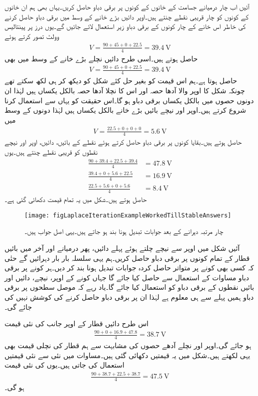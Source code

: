 آئیں اب چار درمیانے جسامت کے خانوں کے کونوں پر برقی دباو حاصل کریں۔یہاں بھی ہم ان خانوں کے کونوں کو چار قریبی نقطے چنتے ہیں۔اوپر دائیں بڑے خانے کے وسط میں برقی دباو حاصل کرنے کی خاطر اس خانے کے چار کونوں کے برقی دباو زیر استعمال لائے جائیں گے۔یوں درز پر پینتالیس وولٹ تصور کرتے ہوئے
\begin{align*}
V=\frac{90+45+0+22.5}{4}=\SI{39.4}{\volt}
\end{align*}
حاصل ہوتے ہیں۔اسی طرح دائیں نچلے بڑے خانے کے وسط میں بھی
\begin{align*}
V=\frac{90+45+0+22.5}{4}=\SI{39.4}{\volt}
\end{align*}
حاصل ہوتا ہے۔ہم اس قیمت کو بغیر حل کئے شکل کو دیکھ کر ہی لکھ سکتے تھے چونکہ شکل کا اوپر والا آدھا حصہ اور اس کا نچلا آدھا حصہ بالکل یکساں ہیں لہٰذا ان دونوں حصوں میں بالکل یکساں برقی دباو ہو گا۔اس حقیقت کو یہاں سے استعمال کرنا شروع کرتے ہیں۔اوپر اور نیچے بائیں بڑے خانے بالکل یکساں ہیں لہٰذا دونوں کے وسط میں
\begin{align*}
V=\frac{22.5+0+0+0}{4}=\SI{5.6}{\volt}
\end{align*}
حاصل ہوتے ہیں۔بقایا کونوں پر برقی دباو حاصل کرتے ہوئے نقطے کے بائیں، دائیں، اوپر اور نیچے نقطوں کو قریبی نقطے چنتے ہیں۔یوں
\begin{align*}
\frac{90+39.4+22.5+39.4}{4}&=\SI{47.8}{\volt}\\
\frac{39.4+0+5.6+22.5}{4}&=\SI{16.9}{\volt}\\
\frac{22.5+5.6+0+5.6}{4}&=\SI{8.4}{\volt}
\end{align*}
حاصل ہوتے ہیں۔شکل  میں یہ تمام قیمت دکھائی گئی ہے۔

\begin{figure}
\centering
\texttt{[image: figLaplaceIterationExampleWorkedTillStableAnswers]}
\caption{چار مرتبہ دہرانے کے بعد جوابات تبدیل ہونا بند ہو جاتے ہیں۔یہی اصل جواب ہیں۔}
\label{شکل_لاپلاس_دہرانے_کے_اٹل_جواب}
\end{figure}

آئیں شکل میں اوپر سے نیچے چلتے ہوئے پہلے دائیں، پھر درمیانے اور آخر میں بائیں قطار  کے تمام کونوں پر برقی دباو حاصل کریں۔ہم یہی سلسلہ بار بار دہرائیں گے حتٰی کہ کسی بھی کونے پر متواتر حاصل کردہ جوابات تبدیل ہونا بند کر دیں۔ہر کونے پر برقی دباو مساوات  کے استعمال سے حاصل کیا جائے گا جہاں کونے کے اوپر، نیچے، دائیں اور بائیں نقطوں کے برقی دباو کو استعمال کیا جائے گا۔یاد رہے کہ موصل سطحوں پر برقی دباو ہمیں پہلے  سے ہی معلوم ہے لہٰذا ان پر برقی دباو حاصل کرنے کی کوشش نہیں کی جائے گی۔

اس طرح دائیں قطار کے اوپر جانب  کی نئی قیمت
\begin{align*}
\frac{90+0+16.9+47.8}{4}=\SI{38.7}{\volt}
\end{align*}
ہو جائے گی۔اوپر اور نچلے آدھے حصوں کی مشابہت سے ہم قطار کی نچلی قیمت بھی یہی لکھتے ہیں۔شکل  میں یہ قیمتیں دکھائی گئی ہیں۔مساوات   میں نئی سے نئی قیمتیں استعمال کی جاتی ہیں۔یوں  کی نئی قیمت
\begin{align*}
\frac{90+38.7+22.5+38.7}{4}=\SI{47.5}{\volt}
\end{align*}
ہو گی۔

